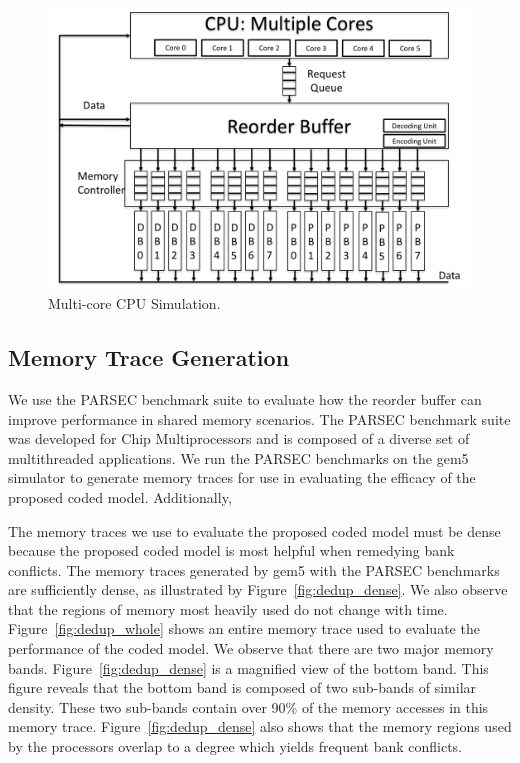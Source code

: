 \begin{figure}[h!] \centering
\includegraphics[width=0.9\linewidth]{figures/multi-core-cpu.png} 
\caption{Multi-core CPU Simulation.}
\label{fig:multi-core-cpu}
\end{figure}

\subsection{Memory Trace Generation}
We use the PARSEC benchmark suite to evaluate how the reorder buffer can improve performance in shared memory scenarios. The PARSEC benchmark suite was developed for Chip Multiprocessors and is composed of a diverse set of multithreaded applications. We run the PARSEC benchmarks on the gem5 simulator to generate memory traces for use in evaluating the efficacy of the proposed coded model. Additionally, 

The memory traces we use to evaluate the proposed coded model must be dense because the proposed coded model is most helpful when remedying bank conflicts. The memory traces generated by gem5 with the PARSEC benchmarks are sufficiently dense, as illustrated by Figure~\ref{fig:dedup_dense}. We also observe that the regions of memory most heavily used do not change with time. Figure~\ref{fig:dedup_whole} shows an entire memory trace used to evaluate the performance of the coded model. We observe that there are two major memory bands. Figure~\ref{fig:dedup_dense} is a magnified view of the bottom band. This figure reveals that the bottom band is composed of two sub-bands of similar density. These two sub-bands contain over 90\% of the memory accesses in this memory trace. Figure~\ref{fig:dedup_dense} also shows that the memory regions used by the processors overlap to a degree which yields frequent bank conflicts.

